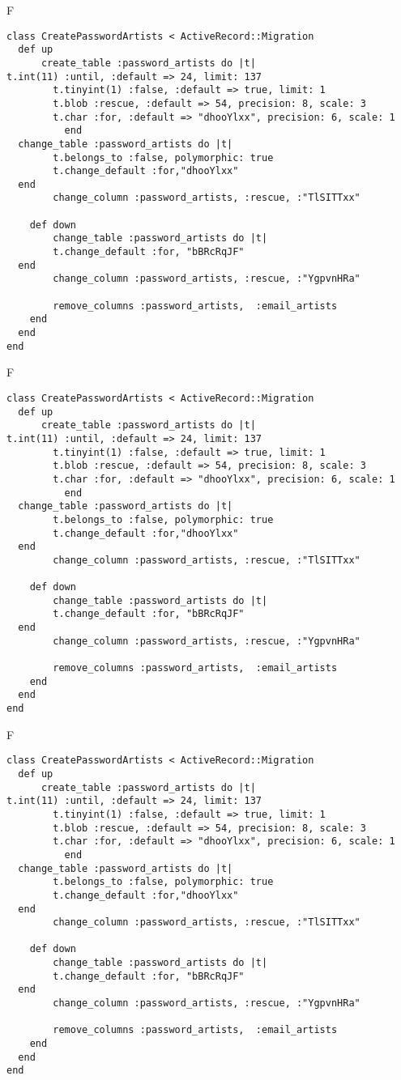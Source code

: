 F
\begin{verbatim}
class CreatePasswordArtists < ActiveRecord::Migration
  def up
	  create_table :password_artists do |t|
t.int(11) :until, :default => 24, limit: 137
		t.tinyint(1) :false, :default => true, limit: 1
		t.blob :rescue, :default => 54, precision: 8, scale: 3
		t.char :for, :default => "dhooYlxx", precision: 6, scale: 1
		  end
  change_table :password_artists do |t|
		t.belongs_to :false, polymorphic: true
 		t.change_default :for,"dhooYlxx"
  end
 		change_column :password_artists, :rescue, :"TlSITTxx"
   
	def down
		change_table :password_artists do |t|
		t.change_default :for, "bBRcRqJF"
  end
 		change_column :password_artists, :rescue, :"YgpvnHRa"
   
		remove_columns :password_artists,  :email_artists 
    end 
  end
end

\end{verbatim}

F
\begin{verbatim}
class CreatePasswordArtists < ActiveRecord::Migration
  def up
	  create_table :password_artists do |t|
t.int(11) :until, :default => 24, limit: 137
		t.tinyint(1) :false, :default => true, limit: 1
		t.blob :rescue, :default => 54, precision: 8, scale: 3
		t.char :for, :default => "dhooYlxx", precision: 6, scale: 1
		  end
  change_table :password_artists do |t|
		t.belongs_to :false, polymorphic: true
 		t.change_default :for,"dhooYlxx"
  end
 		change_column :password_artists, :rescue, :"TlSITTxx"
   
	def down
		change_table :password_artists do |t|
		t.change_default :for, "bBRcRqJF"
  end
 		change_column :password_artists, :rescue, :"YgpvnHRa"
   
		remove_columns :password_artists,  :email_artists 
    end 
  end
end

\end{verbatim}

F
\begin{verbatim}
class CreatePasswordArtists < ActiveRecord::Migration
  def up
	  create_table :password_artists do |t|
t.int(11) :until, :default => 24, limit: 137
		t.tinyint(1) :false, :default => true, limit: 1
		t.blob :rescue, :default => 54, precision: 8, scale: 3
		t.char :for, :default => "dhooYlxx", precision: 6, scale: 1
		  end
  change_table :password_artists do |t|
		t.belongs_to :false, polymorphic: true
 		t.change_default :for,"dhooYlxx"
  end
 		change_column :password_artists, :rescue, :"TlSITTxx"
   
	def down
		change_table :password_artists do |t|
		t.change_default :for, "bBRcRqJF"
  end
 		change_column :password_artists, :rescue, :"YgpvnHRa"
   
		remove_columns :password_artists,  :email_artists 
    end 
  end
end

\end{verbatim}

